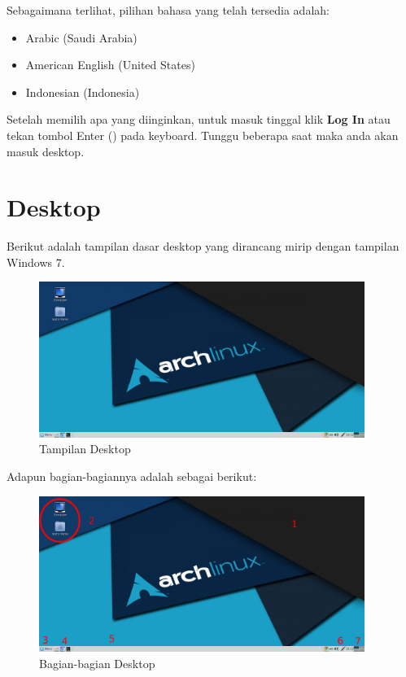 \documentclass[12pt,]{article}
\begin{document}
	Sebagaimana terlihat, pilihan bahasa yang telah tersedia adalah:

	\begin{itemize}
		\item Arabic (Saudi Arabia)
		\item American English (United States)
		\item Indonesian (Indonesia)
	\end{itemize}

	Setelah memilih apa yang diinginkan, untuk masuk tinggal klik \textbf{Log In} atau tekan tombol Enter (\keys{\return}) pada keyboard.
	Tunggu beberapa saat maka anda akan masuk desktop.

	\newpage

	\section{Desktop}

	Berikut adalah tampilan dasar desktop yang dirancang mirip dengan tampilan Windows 7.

	\begin{figure}[!ht]
		\centering
		\includegraphics[width=300pt]{png/desktop}
		\caption{Tampilan Desktop}
	\end{figure}

	Adapun bagian-bagiannya adalah sebagai berikut:

	\begin{figure}[!ht]
		\centering
		\includegraphics[width=300pt]{png/desktop_part}
		\caption{Bagian-bagian Desktop}
	\end{figure}
\end{document}

